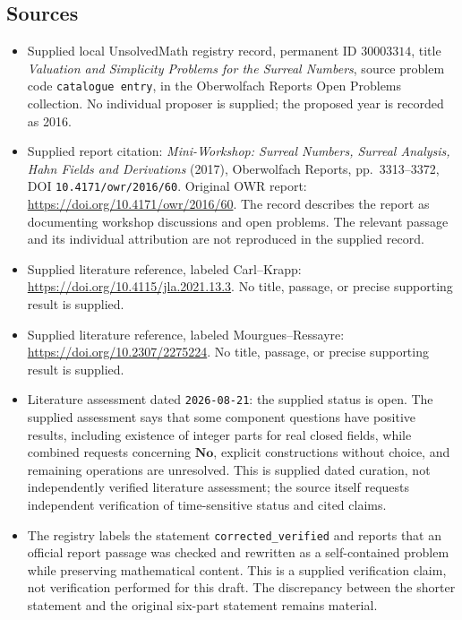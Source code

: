 \documentclass[11pt]{article}
\begin{document}
\subsection{Sources}
\begin{itemize}
\item Supplied local UnsolvedMath registry record, permanent ID \(30003314\), title \emph{Valuation and Simplicity Problems for the Surreal Numbers}, source problem code \texttt{catalogue entry}, in the Oberwolfach Reports Open Problems collection. No individual proposer is supplied; the proposed year is recorded as 2016.
\item Supplied report citation: \emph{Mini-Workshop: Surreal Numbers, Surreal Analysis, Hahn Fields and Derivations} (2017), Oberwolfach Reports, pp.\ 3313--3372, DOI \texttt{10.4171/owr/2016/60}. Original OWR report: \url{https://doi.org/10.4171/owr/2016/60}. The record describes the report as documenting workshop discussions and open problems. The relevant passage and its individual attribution are not reproduced in the supplied record.
\item Supplied literature reference, labeled Carl--Krapp: \url{https://doi.org/10.4115/jla.2021.13.3}. No title, passage, or precise supporting result is supplied.
\item Supplied literature reference, labeled Mourgues--Ressayre: \url{https://doi.org/10.2307/2275224}. No title, passage, or precise supporting result is supplied.
\item Literature assessment dated \texttt{2026-08-21}: the supplied status is open. The supplied assessment says that some component questions have positive results, including existence of integer parts for real closed fields, while combined requests concerning \(\mathbf{No}\), explicit constructions without choice, and remaining operations are unresolved. This is supplied dated curation, not independently verified literature assessment; the source itself requests independent verification of time-sensitive status and cited claims.
\item The registry labels the statement \texttt{corrected\_verified} and reports that an official report passage was checked and rewritten as a self-contained problem while preserving mathematical content. This is a supplied verification claim, not verification performed for this draft. The discrepancy between the shorter statement and the original six-part statement remains material.
\end{itemize}
\end{document}
